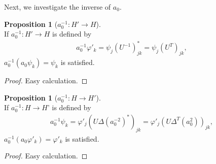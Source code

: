 \documentclass{article}
\theoremstyle{definition}
\newtheorem{prop}[dfn]{Proposition}
\begin{document}
Next, we investigate the inverse of $a_0$. 

\begin{prop}[$a_0^{-1} : H' \to H$]\label{prop:a01_Hprime_H}~\\
  If $a_0^{-1} : H' \to H$ is defined by
  \begin{align}
    a_0^{-1} \varphi'_k = \psi_j (U^{-1})^*_{jk} = \psi_j (U^{T})_{jk}, 
    \label{eq:inversea0_varphi}
  \end{align}
  $a_0^{-1} (a_0 \psi_k) = \psi_k$ is satisfied.
\end{prop}
\begin{proof}
  Easy calculation.
\end{proof}

\begin{prop}[$a_0^{-1} : H \to H'$]\label{prop:a01_H_Hprime}~\\
  If $a_0^{-1} : H \to H$' is defined by
  \begin{align}
    a_0^{-1} \psi_k = \varphi'_j (U \Delta(a_0^{-2})^*)_{jk} = \varphi'_j (U \Delta^T(a_0^{2}))_{jk}, 
    \label{eq:inversea0_varphi_HHprime}
  \end{align}
  $a_0^{-1} (a_0 \varphi'_k) = \varphi'_k$ is satisfied.
\end{prop}
\begin{proof}
  Easy calculation.
\end{proof}
\end{document}
